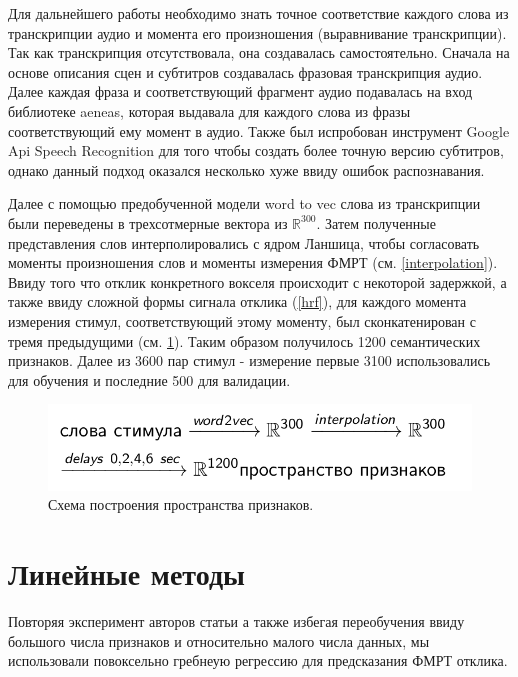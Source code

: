 \documentclass[pdftex,ptm,12pt,a4paper]{report}
\theoremstyle{definition}
\begin{document}
Для дальнейшего работы необходимо знать точное соответствие каждого слова из транскрипции аудио и момента его произношения (выравнивание транскрипции). Так как транскрипция отсутствовала, она создавалась самостоятельно. Сначала на основе описания сцен и субтитров создавалась фразовая транскрипция аудио. Далее каждая фраза и соответствующий фрагмент аудио подавалась на вход библиотеке aeneas, которая выдавала для каждого слова из фразы соответствующий ему момент в аудио. Также был испробован инструмент Google Api Speech Recognition для того чтобы создать более точную версию субтитров, однако данный подход оказался несколько хуже ввиду ошибок распознавания.

Далее с помощью предобученной модели word to vec слова из транскрипции были переведены в трехсотмерные вектора из $\mathbb{R}^{300}.$ Затем полученные представления слов интерполировались с ядром Ланшица, чтобы согласовать моменты произношения слов и моменты измерения ФМРТ (см. \ref{interpolation}). Ввиду того что отклик конкретного вокселя происходит с некоторой задержкой, а также ввиду сложной формы сигнала отклика (\ref{hrf}), для каждого момента измерения стимул, соответствующий этому моменту, был сконкатенирован с тремя предыдущими (см. \ref{schema}). Таким образом получилось 1200 семантических признаков. Далее из 3600 пар стимул - измерение первые 3100 использовались для обучения и последние 500 для валидации.

\begin{figure}[h]
\includegraphics[scale=0.4]{images/schema.png}
\centering
\caption{Схема построения пространства признаков.}
\label{schema}
\end{figure}

\section{Линейные методы}

Повторяя эксперимент авторов статьи \citep{huth2016natural} а также избегая переобучения ввиду большого числа признаков и относительно малого числа данных, мы использовали повоксельно гребнеую регрессию для предсказания ФМРТ отклика.
\end{document}
